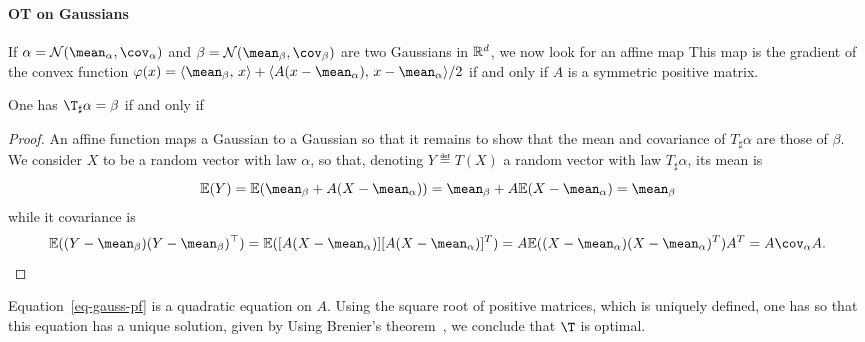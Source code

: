 \paragraph{OT on Gaussians}


If $\al = \Nn(\mean_\al,\cov_\al)$ and $\be = \Nn(\mean_\be,\cov_\be)$ are two Gaussians in $\mathbb{R}^d$, we now look for an affine map
This map is the gradient of the convex function $\phi(x) = \dotp{\mean_\be}{x} + \dotp{A(x-\mean_\al)}{x-\mean_\al}/2$ if and only if $A$ is a symmetric positive matrix. 

\begin{prop}
One has $\T_\sharp \al=\be$ if and only if 
\end{prop}

\begin{proof}
An affine function maps a Gaussian to a Gaussian so that it remains to show that the mean and covariance of $T_\sharp \alpha$ are those of $\beta$. We consider $X$ to be a random vector with law $\alpha$, so that, denoting $Y \eqdef T(X)$ a random vector with law $T_\sharp \alpha$, its mean is 
$$
	\EE(Y) = \EE( \mean_\be + A(X-\mean_\al) )	= \mean_\be + A \EE(X-\mean_\al) =  \mean_\be
$$
while it covariance is
$$
	\EE( (Y-\mean_\be) (Y-\mean_\be)^\top ) = \EE( [A(X-\mean_\al)] [ A(X-\mean_\al) ]^T ) = A \EE( (X-\mean_\al)(X-\mean_\al) ^T ) A^T
	= A \cov_\alpha A. 
$$
\end{proof}

Equation~\eqref{eq-gauss-pf} is a quadratic equation on $A$. Using the square root of positive matrices, which is uniquely defined, one has 
so that this equation has a unique solution, given by
Using Brenier's theorem~\cite{Brenier91}, we conclude that $\T$ is optimal. 
 
